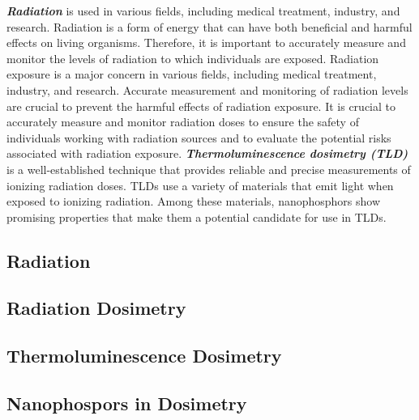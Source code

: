 \documentclass[../../Report.tex]{subfiles}
\begin{document}
    \textit{\textbf{Radiation}} is used in various fields, including medical treatment, industry, and research. 
    Radiation is a form of energy that can have both beneficial and harmful effects on living organisms.
    Therefore, it is important to accurately measure and monitor the levels of radiation to which individuals are exposed.
    Radiation exposure is a major concern in various fields, including medical treatment, industry, and research. Accurate 
    measurement and monitoring of radiation levels are crucial to prevent the harmful effects of radiation exposure.
    It is crucial to accurately measure and monitor radiation doses to ensure the safety of 
    individuals working with radiation sources and to evaluate the potential risks associated with radiation exposure. 
    \textit{\textbf{Thermoluminescence dosimetry (TLD)}} is a well-established technique that provides reliable and precise measurements 
    of ionizing radiation doses. TLDs use a variety of materials that emit light when exposed to ionizing radiation. 
    Among these materials, nanophosphors show promising properties that make them a potential candidate for use in TLDs. 

    \subsection{\large Radiation}
        

    \newpage
    \subsection{\large Radiation Dosimetry}
        
    \newpage
    \subsection{\large Thermoluminescence Dosimetry}
        
        
    \newpage
    \subsection{\large Nanophospors in Dosimetry}
        
\end{document}
